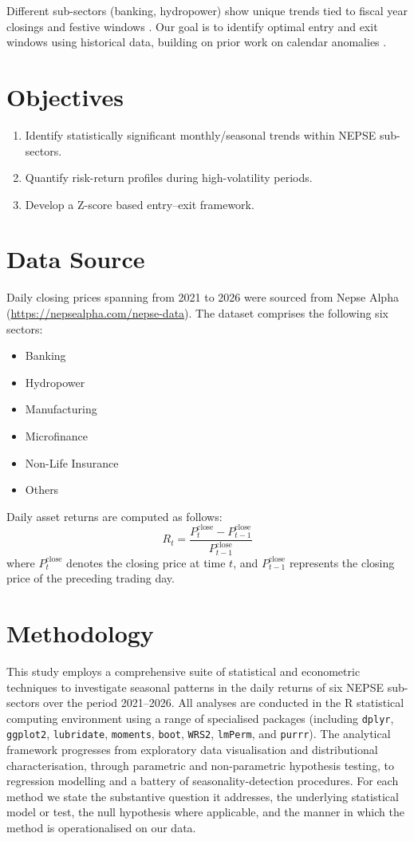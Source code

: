\documentclass[12pt,a4paper,fleqn]{article}
\begin{document}
Different sub-sectors (banking, hydropower) show unique trends tied to fiscal year closings and festive windows \cite{gurung2024fiscal}. Our goal is to identify optimal entry and exit windows using historical data, building on prior work on calendar anomalies \cite{adhikari2024calendar, sharma2021investor}.

\section{Objectives}
\begin{enumerate}
    \item Identify statistically significant monthly/seasonal trends within NEPSE sub-sectors.
    \item Quantify risk-return profiles during high-volatility periods.
    \item Develop a Z-score based entry–exit framework.
\end{enumerate}

\section{Data Source}
Daily closing prices spanning from 2021 to 2026 were sourced from Nepse Alpha (\url{https://nepsealpha.com/nepse-data}). The dataset comprises the following six sectors:
\begin{itemize}
    \item Banking
    \item Hydropower
    \item Manufacturing
    \item Microfinance
    \item Non-Life Insurance
    \item Others
\end{itemize}

Daily asset returns are computed as follows:
\[
R_t = \frac{P_t^{\text{close}} - P_{t-1}^{\text{close}}}{P_{t-1}^{\text{close}}}
\]
where $P_t^{\text{close}}$ denotes the closing price at time $t$, and $P_{t-1}^{\text{close}}$ represents the closing price of the preceding trading day.
\section{Methodology}

This study employs a comprehensive suite of statistical and econometric techniques to investigate seasonal patterns in the daily returns of six NEPSE sub-sectors over the period 2021–2026. All analyses are conducted in the R statistical computing environment \cite{rcore2024} using a range of specialised packages (including \texttt{dplyr}, \texttt{ggplot2}, \texttt{lubridate}, \texttt{moments}, \texttt{boot}, \texttt{WRS2}, \texttt{lmPerm}, and \texttt{purrr}). The analytical framework progresses from exploratory data visualisation and distributional characterisation, through parametric and non-parametric hypothesis testing, to regression modelling and a battery of seasonality-detection procedures. For each method we state the substantive question it addresses, the underlying statistical model or test, the null hypothesis where applicable, and the manner in which the method is operationalised on our data.
\end{document}
